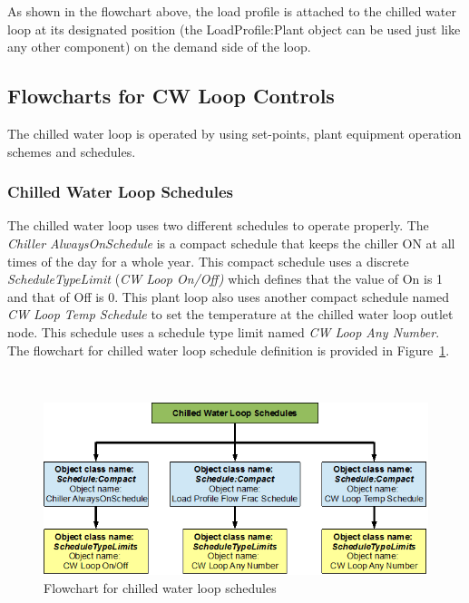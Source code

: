 As shown in the flowchart above, the load profile is attached to the chilled water loop at its designated position (the LoadProfile:Plant object can be used just like any other component) on the demand side of the loop.

\subsection{Flowcharts for CW Loop Controls}\label{flowcharts-for-cw-loop-controls}

The chilled water loop is operated by using set-points, plant equipment operation schemes and schedules.

\subsubsection{Chilled Water Loop Schedules}\label{chilled-water-loop-schedules}

The chilled water loop uses two different schedules to operate properly. The \emph{Chiller AlwaysOnSchedule} is a compact schedule that keeps the chiller ON at all times of the day for a whole year. This compact schedule uses a discrete \emph{ScheduleTypeLimit} (\emph{CW Loop On/Off)} which defines that the value of On is 1 and that of Off is 0. This plant loop also uses another compact schedule named \emph{CW Loop Temp Schedule} to set the temperature at the chilled water loop outlet node. This schedule uses a schedule type limit named \emph{CW Loop Any Number}. The flowchart for chilled water loop schedule definition is provided in Figure~\ref{fig:flowchart-for-chilled-water-loop-schedules}.

\emph{~}

\begin{figure}[htbp]
\centering
\includegraphics{media/image024.png}
\caption{Flowchart for chilled water loop schedules \protect \label{fig:flowchart-for-chilled-water-loop-schedules}}
\end{figure}

